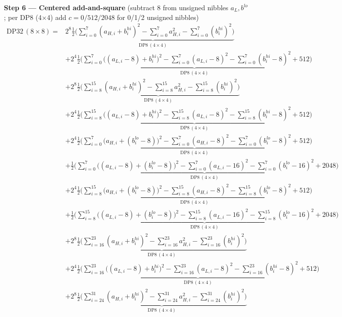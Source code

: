 \documentclass[fleqn]{article}
\newcommand{\DPop}[3]{\mathrm{DP#1}\,(#2\!\times\!#3)}
\begin{document}
\textbf{Step 6 --- Centered add-and-square}\quad
{\small(subtract $8$ from unsigned nibbles $a_L,b^{lo}$; per DP8 (4$\times$4) add $c=0/512/2048$ for 0/1/2 unsigned nibbles)}
\begin{align*}
\DPop{32}{8}{8} = {}
  & 2^{8}\underbrace{\tfrac12\Big(\sum_{i=0}^{7}(a_{H,i}{+}b_i^{hi})^2 - \sum_{i=0}^{7}a_{H,i}^2 - \sum_{i=0}^{7}(b_i^{hi})^2\Big)}_{\DPop{8}{4}{4}} \\[0.5em]
  & + 2^{4}\underbrace{\tfrac12\Big(\sum_{i=0}^{7}\big((a_{L,i}{-}8){+}b_i^{hi}\big)^2 - \sum_{i=0}^{7}(a_{L,i}{-}8)^2 - \sum_{i=0}^{7}(b_i^{hi}{-}8)^2 + 512\Big)}_{\DPop{8}{4}{4}} \\[0.5em]
  & + 2^{8}\underbrace{\tfrac12\Big(\sum_{i=8}^{15}(a_{H,i}{+}b_i^{hi})^2 - \sum_{i=8}^{15}a_{H,i}^2 - \sum_{i=8}^{15}(b_i^{hi})^2\Big)}_{\DPop{8}{4}{4}} \\[0.5em]
  & + 2^{4}\underbrace{\tfrac12\Big(\sum_{i=8}^{15}\big((a_{L,i}{-}8){+}b_i^{hi}\big)^2 - \sum_{i=8}^{15}(a_{L,i}{-}8)^2 - \sum_{i=8}^{15}(b_i^{hi}{-}8)^2 + 512\Big)}_{\DPop{8}{4}{4}} \\[0.5em]
  & + 2^{4}\underbrace{\tfrac12\Big(\sum_{i=0}^{7}\big(a_{H,i}{+}(b_i^{lo}{-}8)\big)^2 - \sum_{i=0}^{7}(a_{H,i}{-}8)^2 - \sum_{i=0}^{7}(b_i^{lo}{-}8)^2 + 512\Big)}_{\DPop{8}{4}{4}} \\[0.5em]
  & + \underbrace{\tfrac12\Big(\sum_{i=0}^{7}\big((a_{L,i}{-}8){+}(b_i^{lo}{-}8)\big)^2 - \sum_{i=0}^{7}(a_{L,i}{-}16)^2 - \sum_{i=0}^{7}(b_i^{lo}{-}16)^2 + 2048\Big)}_{\DPop{8}{4}{4}} \\[0.5em]
  & + 2^{4}\underbrace{\tfrac12\Big(\sum_{i=8}^{15}\big(a_{H,i}{+}(b_i^{lo}{-}8)\big)^2 - \sum_{i=8}^{15}(a_{H,i}{-}8)^2 - \sum_{i=8}^{15}(b_i^{lo}{-}8)^2 + 512\Big)}_{\DPop{8}{4}{4}} \\[0.5em]
  & + \underbrace{\tfrac12\Big(\sum_{i=8}^{15}\big((a_{L,i}{-}8){+}(b_i^{lo}{-}8)\big)^2 - \sum_{i=8}^{15}(a_{L,i}{-}16)^2 - \sum_{i=8}^{15}(b_i^{lo}{-}16)^2 + 2048\Big)}_{\DPop{8}{4}{4}} \\[0.5em]
  & + 2^{8}\underbrace{\tfrac12\Big(\sum_{i=16}^{23}(a_{H,i}{+}b_i^{hi})^2 - \sum_{i=16}^{23}a_{H,i}^2 - \sum_{i=16}^{23}(b_i^{hi})^2\Big)}_{\DPop{8}{4}{4}} \\[0.5em]
  & + 2^{4}\underbrace{\tfrac12\Big(\sum_{i=16}^{23}\big((a_{L,i}{-}8){+}b_i^{hi}\big)^2 - \sum_{i=16}^{23}(a_{L,i}{-}8)^2 - \sum_{i=16}^{23}(b_i^{hi}{-}8)^2 + 512\Big)}_{\DPop{8}{4}{4}} \\[0.5em]
  & + 2^{8}\underbrace{\tfrac12\Big(\sum_{i=24}^{31}(a_{H,i}{+}b_i^{hi})^2 - \sum_{i=24}^{31}a_{H,i}^2 - \sum_{i=24}^{31}(b_i^{hi})^2\Big)}_{\DPop{8}{4}{4}} \\[0.5em]

\end{align*}
\end{document}
